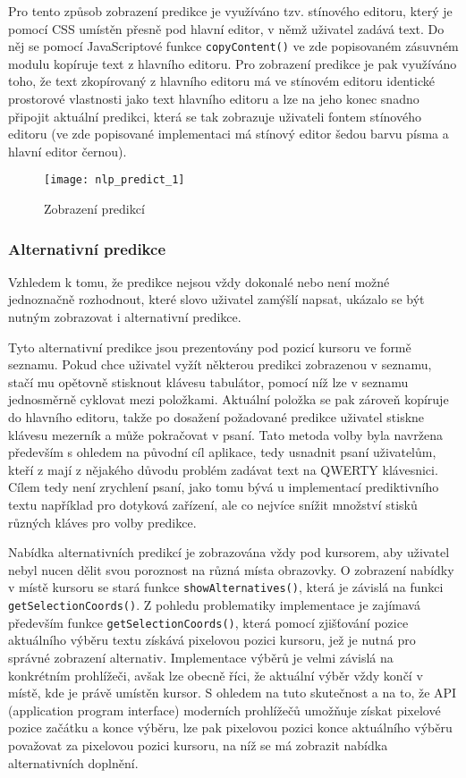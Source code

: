 \documentclass[a4paper,11pt]{article}
\begin{document}
Pro tento způsob zobrazení predikce je využíváno tzv. stínového editoru, který je pomocí CSS umístěn přesně pod hlavní editor, v němž uživatel zadává text. Do něj se pomocí JavaScriptové funkce {\tt copyContent()} ve zde popisovaném zásuvném modulu kopíruje text z hlavního editoru. Pro zobrazení predikce je pak využíváno toho, že text zkopírovaný z hlavního editoru má ve stínovém editoru identické prostorové vlastnosti jako text hlavního editoru a lze na jeho konec snadno připojit aktuální predikci, která se tak zobrazuje uživateli fontem stínového editoru (ve zde popisované implementaci má stínový editor šedou barvu písma a hlavní editor černou).

\begin{figure}[ht]
	\centering
	\texttt{[image: nlp\_predict\_1]}
	\caption{Zobrazení predikcí}
	\label{fig:nlp-predict}
\end{figure}

\subsubsection{Alternativní predikce}

Vzhledem k tomu, že predikce nejsou vždy dokonalé nebo není možné jednoznačně rozhodnout, které slovo uživatel zamýšlí napsat, ukázalo se být nutným zobrazovat i alternativní predikce. 

Tyto alternativní predikce jsou prezentovány pod pozicí kursoru ve formě seznamu. Pokud chce uživatel vyžít některou predikci zobrazenou v seznamu, stačí mu opětovně stisknout klávesu tabulátor, pomocí níž lze v seznamu jednosměrně cyklovat mezi položkami. Aktuální položka se pak zároveň kopíruje do hlavního editoru, takže po dosažení požadované predikce uživatel stiskne klávesu mezerník a může pokračovat v psaní. Tato metoda volby byla navržena především s ohledem na původní cíl aplikace, tedy usnadnit psaní uživatelům, kteří z mají z nějakého důvodu problém zadávat text na QWERTY klávesnici. Cílem tedy není zrychlení psaní, jako tomu bývá u implementací prediktivního textu například pro dotyková zařízení, ale co nejvíce snížit množství stisků různých kláves pro volby predikce.

Nabídka alternativních predikcí je zobrazována vždy pod kursorem, aby uživatel nebyl nucen dělit svou poroznost na různá místa obrazovky. O zobrazení nabídky v místě kursoru se stará funkce {\tt showAlternatives()}, která je závislá na funkci {\tt getSelectionCoords()}. Z pohledu problematiky implementace je zajímavá především funkce {\tt getSelectionCoords()}, která pomocí zjišťování pozice aktuálního výběru textu získává pixelovou pozici kursoru, jež je nutná pro správné zobrazení alternativ. Implementace výběrů je velmi závislá na konkrétním prohlížeči, avšak lze obecně říci, že aktuální výběr vždy končí v místě, kde je právě umístěn kursor. S ohledem na tuto skutečnost a na to, že API (application program interface) moderních prohlížečů umožňuje získat pixelové pozice začátku a konce výběru, lze pak pixelovou pozici konce aktuálního výběru považovat za pixelovou pozici kursoru, na níž se má zobrazit nabídka alternativních doplnění. 
\end{document}
